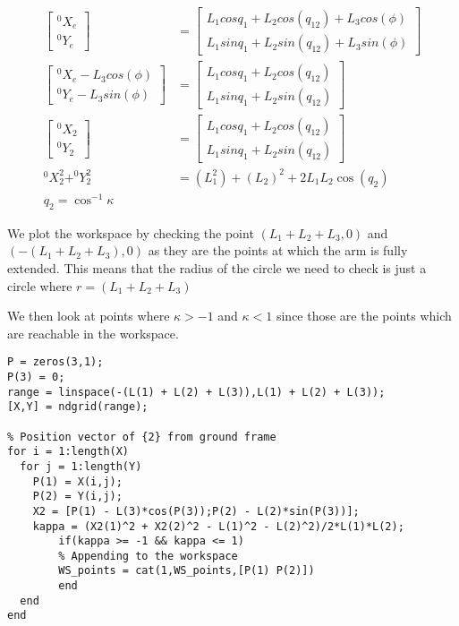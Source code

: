 \documentclass[11pt]{report}
\begin{document}
\begin{enumerate}
\begin{enumerate}
\begin{enumerate}
\begin{align*}
\begin{bmatrix} ^0X_e \\ ^0Y_e \end{bmatrix} &= \begin{bmatrix}L_1 cos q_1 + L_2cos(q_{12}) + L_3 cos(\phi) \\ L_1 sin q_1 + L_2sin(q_{12}) + L_3 sin(\phi) \end{bmatrix}\\
\begin{bmatrix} ^0X_e - L_3 cos(\phi) \\ ^0Y_e - L_3 sin(\phi) \end{bmatrix} &= \begin{bmatrix}L_1 cos q_1 + L_2cos(q_{12}) \\ L_1 sin q_1 + L_2sin(q_{12}) \end{bmatrix} \\
\begin{bmatrix} ^0X_2 \\ ^0Y_2 \end{bmatrix} &= \begin{bmatrix}L_1 cos q_1 + L_2cos(q_{12}) \\ L_1 sin q_1 + L_2sin(q_{12}) \end{bmatrix} \\
^0X_2^2 + ^0Y_2^2 &= (L_1^2) + (L_2)^2 + 2L_1L_2\cos(q_2)\\
q_2 = \cos^{-1}\kappa
\end{align*}

We plot the workspace by checking the point \((L_{1} + L_2 + L_3,0)\) and \((-(L_1 + L_2 + L_3),0)\) as they are the points at which the arm is fully extended. This means that the radius of the circle we need to check is just a circle where \(r = (L_1 + L_2 + L_{3})\)

We then look at points where \(\kappa > -1\) and \(\kappa < 1\) since those are the points which are reachable in the workspace.

\begin{verbatim}
P = zeros(3,1);
P(3) = 0;
range = linspace(-(L(1) + L(2) + L(3)),L(1) + L(2) + L(3));
[X,Y] = ndgrid(range);

% Position vector of {2} from ground frame
for i = 1:length(X)
  for j = 1:length(Y)
    P(1) = X(i,j);
    P(2) = Y(i,j);
    X2 = [P(1) - L(3)*cos(P(3));P(2) - L(2)*sin(P(3))];
    kappa = (X2(1)^2 + X2(2)^2 - L(1)^2 - L(2)^2)/2*L(1)*L(2);
        if(kappa >= -1 && kappa <= 1)
        % Appending to the workspace
        WS_points = cat(1,WS_points,[P(1) P(2)])
        end
  end
end
\end{verbatim}


\end{enumerate}
\end{enumerate}
\end{enumerate}
\end{document}
